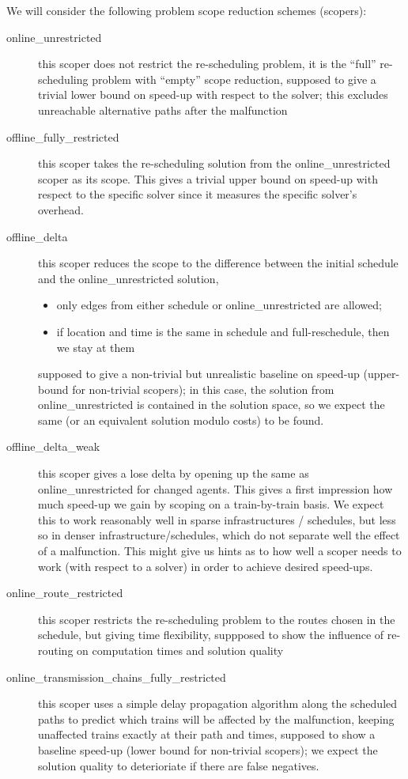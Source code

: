 \documentclass{article}
\begin{document}
We will consider the following problem scope reduction schemes (scopers):
\begin{description}
\item[online\_unrestricted] this scoper does not restrict the re-scheduling problem, it is the ``full'' re-scheduling problem with ``empty'' scope reduction, supposed to give a trivial lower bound on speed-up with respect to the solver; this excludes unreachable alternative paths after the malfunction
\item[offline\_fully\_restricted] this scoper takes the re-scheduling solution from the online\_unrestricted scoper as its scope. This gives a trivial upper bound on speed-up with respect to the specific solver since it measures the specific solver's overhead.
\item[offline\_delta]  this scoper reduces the  scope to the difference between the initial schedule and the online\_unrestricted solution,
\begin{itemize}
    \item only edges from either schedule or online\_unrestricted are allowed;
    \item if location and time is the same in schedule and full-reschedule, then we stay at them
\end{itemize}
supposed to give a non-trivial but unrealistic baseline on speed-up (upper-bound for non-trivial scopers); in this case, the solution from online\_unrestricted is contained in the solution space, so we expect the same (or an equivalent solution modulo costs) to be found.
\item[offline\_delta\_weak] this scoper gives a lose delta by opening up the same as online\_unrestricted for changed agents. This gives a first impression how much speed-up we gain by scoping on a train-by-train basis. We expect this to work reasonably well in sparse infrastructures / schedules, but less so in denser infrastructure/schedules, which do not separate well the effect of a malfunction. This might give us hints as to how well a scoper needs to work (with respect to a solver) in order to achieve desired speed-ups.
\item[online\_route\_restricted] this scoper restricts the re-scheduling problem to the routes chosen in the schedule, but giving time flexibility, suppposed to show the influence of re-routing on computation times and solution quality
\item[online\_transmission\_chains\_fully\_restricted] this scoper uses a simple delay propagation algorithm along the scheduled paths to predict which trains will be affected by the malfunction, keeping unaffected trains exactly at their path and times, supposed to show a baseline speed-up (lower bound for non-trivial scopers); we expect the solution quality to deterioriate if there are false negatives.

\end{description}
\end{document}

